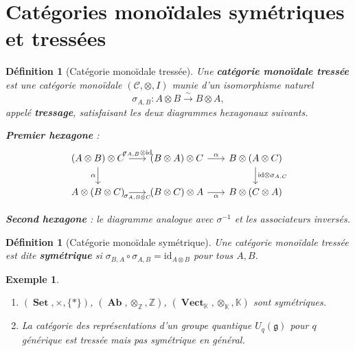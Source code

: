 \documentclass[a4paper,12pt]{book}
\DeclareMathOperator{\Set}{\mathbf{Set}}
\DeclareMathOperator{\Ab}{\mathbf{Ab}}
\DeclareMathOperator{\Vect}{\mathbf{Vect}}
\newcommand{\id}{\mathrm{id}}
\newcommand{\Z}{\mathbb{Z}}
\newcommand{\K}{\mathbb{K}}
\newtheorem{definition}[theoreme]{Définition}
\newtheorem{exemple}[theoreme]{Exemple}
\begin{document}
\section{Catégories monoïdales symétriques et tressées}
\label{sec:symetrique-tressee}

\begin{definition}[Catégorie monoïdale tressée]\label{def:monoidale-tressee}
Une \textbf{catégorie monoïdale tressée} est une catégorie monoïdale
$(\mathcal{C}, \otimes, I)$ munie d'un isomorphisme naturel
\[
  \sigma_{A,B} \colon A \otimes B \xrightarrow{\;\sim\;} B \otimes A,
\]
appelé \textbf{tressage}, satisfaisant les deux diagrammes hexagonaux
suivants.

\medskip
\noindent\textbf{Premier hexagone} :
\[
\begin{tikzcd}[column sep=1.8em]
(A \otimes B) \otimes C
  \arrow[r, "\sigma_{A,B} \otimes \id"]
  \arrow[d, "\alpha"'] &
(B \otimes A) \otimes C
  \arrow[r, "\alpha"] &
B \otimes (A \otimes C)
  \arrow[d, "\id \otimes \sigma_{A,C}"] \\
A \otimes (B \otimes C)
  \arrow[r, "\sigma_{A,B \otimes C}"'] &
(B \otimes C) \otimes A
  \arrow[r, "\alpha"'] &
B \otimes (C \otimes A)
\end{tikzcd}
\]

\noindent\textbf{Second hexagone} : le diagramme analogue avec
$\sigma^{-1}$ et les associateurs inversés.
\end{definition}

\begin{definition}[Catégorie monoïdale symétrique]\label{def:monoidale-symetrique}
Une catégorie monoïdale tressée est dite \textbf{symétrique} si
$\sigma_{B,A} \circ \sigma_{A,B} = \id_{A \otimes B}$
pour tous $A, B$.
\end{definition}

\begin{exemple}\label{ex:symetrique-vs-tressee}
\begin{enumerate}[label=(\roman*)]
\item $(\Set, \times, \{*\})$, $(\Ab, \otimes_\Z, \Z)$,
      $(\Vect_\K, \otimes_\K, \K)$ sont symétriques.
\item La catégorie des représentations d'un groupe quantique
      $U_q(\mathfrak{g})$ pour $q$ générique est tressée mais
      \emph{pas} symétrique en général.
\end{enumerate}
\end{exemple}
\end{document}
